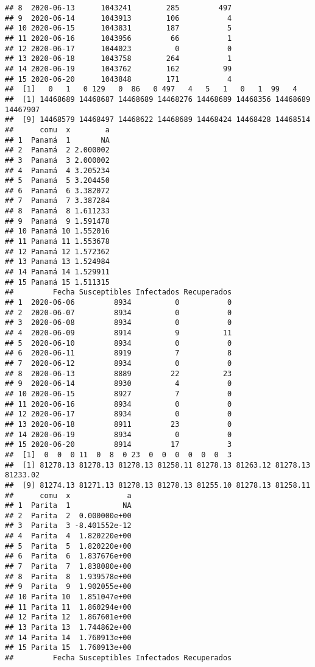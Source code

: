\documentclass[
]{article}
\begin{document}
\begin{verbatim}
## 8  2020-06-13      1043241        285         497
## 9  2020-06-14      1043913        106           4
## 10 2020-06-15      1043831        187           5
## 11 2020-06-16      1043956         66           1
## 12 2020-06-17      1044023          0           0
## 13 2020-06-18      1043758        264           1
## 14 2020-06-19      1043762        162          99
## 15 2020-06-20      1043848        171           4
##  [1]   0   1   0 129   0  86   0 497   4   5   1   0   1  99   4
##  [1] 14468689 14468687 14468689 14468276 14468689 14468356 14468689 14467907
##  [9] 14468579 14468497 14468622 14468689 14468424 14468428 14468514
##      comu  x        a
## 1  Panamá  1       NA
## 2  Panamá  2 2.000002
## 3  Panamá  3 2.000002
## 4  Panamá  4 3.205234
## 5  Panamá  5 3.204450
## 6  Panamá  6 3.382072
## 7  Panamá  7 3.387284
## 8  Panamá  8 1.611233
## 9  Panamá  9 1.591478
## 10 Panamá 10 1.552016
## 11 Panamá 11 1.553678
## 12 Panamá 12 1.572362
## 13 Panamá 13 1.524984
## 14 Panamá 14 1.529911
## 15 Panamá 15 1.511315
##         Fecha Susceptibles Infectados Recuperados
## 1  2020-06-06         8934          0           0
## 2  2020-06-07         8934          0           0
## 3  2020-06-08         8934          0           0
## 4  2020-06-09         8914          9          11
## 5  2020-06-10         8934          0           0
## 6  2020-06-11         8919          7           8
## 7  2020-06-12         8934          0           0
## 8  2020-06-13         8889         22          23
## 9  2020-06-14         8930          4           0
## 10 2020-06-15         8927          7           0
## 11 2020-06-16         8934          0           0
## 12 2020-06-17         8934          0           0
## 13 2020-06-18         8911         23           0
## 14 2020-06-19         8934          0           0
## 15 2020-06-20         8914         17           3
##  [1]  0  0  0 11  0  8  0 23  0  0  0  0  0  0  3
##  [1] 81278.13 81278.13 81278.13 81258.11 81278.13 81263.12 81278.13 81233.02
##  [9] 81274.13 81271.13 81278.13 81278.13 81255.10 81278.13 81258.11
##      comu  x             a
## 1  Parita  1            NA
## 2  Parita  2  0.000000e+00
## 3  Parita  3 -8.401552e-12
## 4  Parita  4  1.820220e+00
## 5  Parita  5  1.820220e+00
## 6  Parita  6  1.837676e+00
## 7  Parita  7  1.838080e+00
## 8  Parita  8  1.939578e+00
## 9  Parita  9  1.902055e+00
## 10 Parita 10  1.851047e+00
## 11 Parita 11  1.860294e+00
## 12 Parita 12  1.867601e+00
## 13 Parita 13  1.744862e+00
## 14 Parita 14  1.760913e+00
## 15 Parita 15  1.760913e+00
##         Fecha Susceptibles Infectados Recuperados

\end{verbatim}
\end{document}
